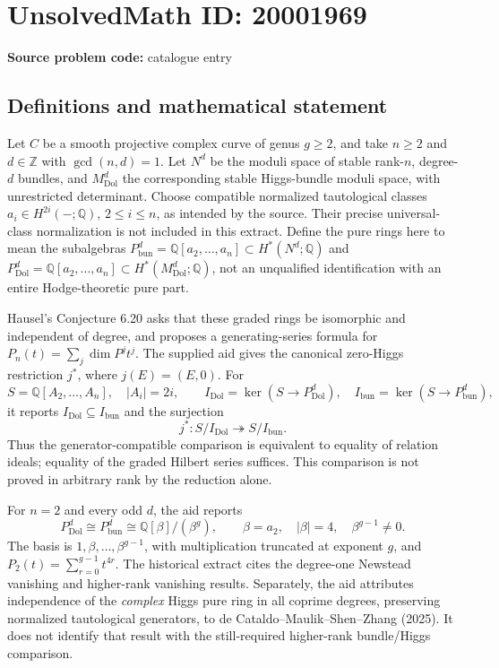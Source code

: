 \documentclass[11pt]{article}
\newcommand{\Z}{\mathbb{Z}}
\newcommand{\Q}{\mathbb{Q}}
\begin{document}
\section*{UnsolvedMath ID: 20001969}
\textbf{Source problem code:} catalogue entry
\subsection{Definitions and mathematical statement}
Let \(C\) be a smooth projective complex curve of genus \(g\geq2\), and take \(n\geq2\) and \(d\in\Z\) with \(\gcd(n,d)=1\). Let \(N^d\) be the moduli space of stable rank-\(n\), degree-\(d\) bundles, and \(M^d_{\mathrm{Dol}}\) the corresponding stable Higgs-bundle moduli space, with unrestricted determinant. Choose compatible normalized tautological classes \(a_i\in H^{2i}(-;\Q)\), \(2\leq i\leq n\), as intended by the source. Their precise universal-class normalization is not included in this extract. Define the pure rings here to mean the subalgebras \(P_{\mathrm{bun}}^d=\Q[a_2,\ldots,a_n]\subset H^*(N^d;\Q)\) and \(P_{\mathrm{Dol}}^d=\Q[a_2,\ldots,a_n]\subset H^*(M^d_{\mathrm{Dol}};\Q)\), not an unqualified identification with an entire Hodge-theoretic pure part.

Hausel's Conjecture 6.20 asks that these graded rings be isomorphic and independent of degree, and proposes a generating-series formula for \(P_n(t)=\sum_j\dim P^jt^j\). The supplied aid gives the canonical zero-Higgs restriction \(j^*\), where \(j(E)=(E,0)\). For
\[
S=\Q[A_2,\ldots,A_n],\quad |A_i|=2i,\qquad
I_{\mathrm{Dol}}=\ker(S\to P_{\mathrm{Dol}}^d),\quad
I_{\mathrm{bun}}=\ker(S\to P_{\mathrm{bun}}^d),
\]
it reports \(I_{\mathrm{Dol}}\subseteq I_{\mathrm{bun}}\) and the surjection
\[
j^*:S/I_{\mathrm{Dol}}\twoheadrightarrow S/I_{\mathrm{bun}}.
\]
Thus the generator-compatible comparison is equivalent to equality of relation ideals; equality of the graded Hilbert series suffices. This comparison is not proved in arbitrary rank by the reduction alone.

For \(n=2\) and every odd \(d\), the aid reports
\[
P_{\mathrm{Dol}}^d\cong P_{\mathrm{bun}}^d\cong\Q[\beta]/(\beta^g),\qquad
\beta=a_2,\quad |\beta|=4,\quad\beta^{g-1}\ne0.
\]
The basis is \(1,\beta,\ldots,\beta^{g-1}\), with multiplication truncated at exponent \(g\), and \(P_2(t)=\sum_{r=0}^{g-1}t^{4r}\). The historical extract cites the degree-one Newstead vanishing and higher-rank vanishing results. Separately, the aid attributes independence of the \emph{complex} Higgs pure ring in all coprime degrees, preserving normalized tautological generators, to de Cataldo--Maulik--Shen--Zhang (2025). It does not identify that result with the still-required higher-rank bundle/Higgs comparison.
\end{document}
